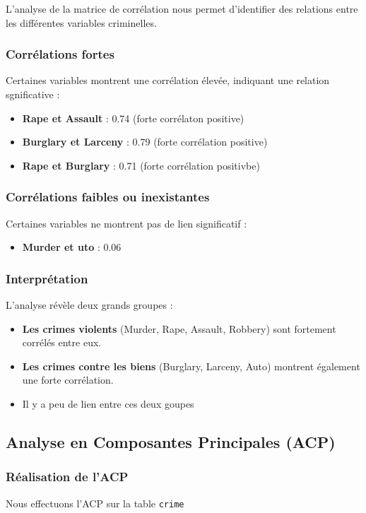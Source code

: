 \documentclass{article}
\begin{document}
    L’analyse de la matrice de corrélation nous permet d’identifier des relations entre les différentes variables criminelles.

    \subsubsection{Corrélations fortes}
    Certaines variables montrent une corrélation élevée, indiquant une relation sgnificative :
    \begin{itemize}
        \item \textbf{Rape et Assault} : 0.74 (forte corrélaton positive)
        \item \textbf{Burglary et Larceny} : 0.79 (forte corrélation positive)
        \item \textbf{Rape et Burglary} : 0.71 (forte corrélation positivbe)
    \end{itemize}

    \subsubsection{Corrélations faibles ou inexistantes}
    Certaines variables ne montrent pas de lien significatif :
    \begin{itemize}
        \item \textbf{Murder et uto} : 0.06
    \end{itemize}

    \subsubsection{Interprétation}
    L'analyse révèle deux grands groupes :
    \begin{itemize}
        \item \textbf{Les crimes violents} (Murder, Rape, Assault, Robbery) sont fortement corrélés entre eux.
        \item \textbf{Les crimes contre les biens} (Burglary, Larceny, Auto) montrent également une forte corrélation.
        \item Il y a peu de lien entre ces deux goupes
    \end{itemize}

    \subsection{Analyse en Composantes Principales (ACP)}

    \subsubsection{Réalisation de l’ACP}
    Nous effectuons l'ACP sur la table \texttt{crime}
\end{document}
